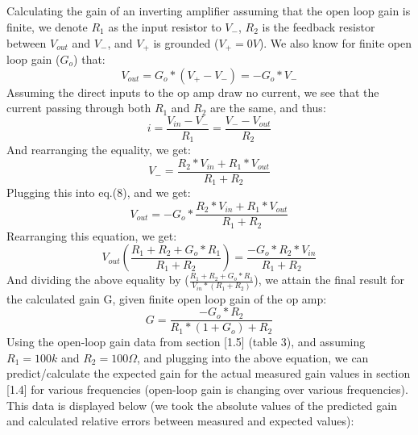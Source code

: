 \documentclass{article}
\begin{document}
\subsection{}
    Calculating the gain of an inverting amplifier assuming that the open loop gain is finite, we denote $R_1$ as the input resistor to $V_-$, $R_2$ is the feedback resistor between $V_{out}$ and $V_-$, and $V_+$ is grounded ($V_+ = 0V$). We also know for finite open loop gain ($G_o$) that:
    \begin{equation}
        V_{out} = G_o*(V_+ - V_-) = -G_o*V_-
    \end{equation}
    Assuming the direct inputs to the op amp draw no current, we see that the current passing through both $R_1$ and $R_2$ are the same, and thus:
    \begin{equation}
        i = \frac{V_{in} - V_-}{R_1} = \frac{V_- - V_{out}}{R_2}
    \end{equation}
    And rearranging the equality, we get:
    \begin{equation}
        V_- = \frac{R_2*V_{in} + R_1*V_{out}}{R_1 + R_2}
    \end{equation}
    Plugging this into eq.(8), and we get:
    \begin{equation}
        V_{out} = -G_o*\frac{R_2*V_{in} + R_1*V_{out}}{R_1 + R_2}
    \end{equation}
    Rearranging this equation, we get:
    \begin{equation}
        V_{out}(\frac{R_1 + R_2+ G_o*R_1}{R_1 + R_2}) = \frac{-G_o*R_2*V_{in}}{R_1 + R_2}
    \end{equation}
    And dividing the above equality by ($\frac{R_1 + R_2+ G_o*R_1}{V_{in}*(R_1 + R_2)}$), we attain the final result for the calculated gain G, given finite open loop gain of the op amp:
    \begin{equation}
        G = \frac{-G_o*R_2}{R_1*(1+G_o)+R_2}
    \end{equation}
    Using the open-loop gain data from section [1.5] (table 3), and assuming $R_1 = 100k$ and $R_2 = 100\Omega$, and plugging into the above equation, we can predict/calculate the expected gain for the actual measured gain values in section [1.4] for various frequencies (open-loop gain is changing over various frequencies). This data is displayed below (we took the absolute values of the predicted gain and calculated relative errors between measured and expected values):
\end{document}
